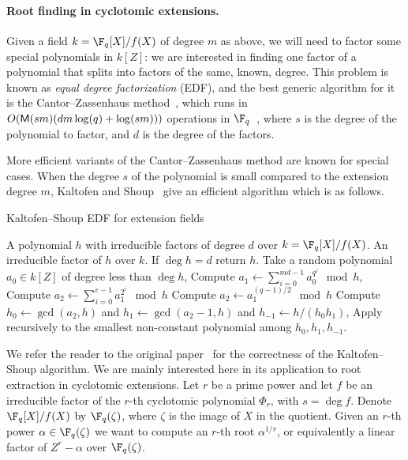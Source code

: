 \paragraph{\bf Root finding in cyclotomic extensions.}
Given a field $k = \F_q[X]/f(X)$ of degree $m$ as above, we will need
to factor some special polynomials in $k[Z]$: we are interested in
finding one factor of a polynomial that splits into factors of the
same, known, degree. This problem is known as \emph{equal degree
  factorization} (EDF), and the best generic algorithm for it is the
Cantor--Zassenhaus method~\cite{cantor1981,vzgathen+shoup92:journal}, which
runs in $O(\mathsf{M}(sm)(dm\log(q) + \log(sm)))$ operations in
$\F_q$~\cite[Th.~14.9]{vzGG}, where $s$ is the degree of the
polynomial to factor, and $d$ is the degree of the factors.

More efficient variants of the Cantor--Zassenhaus method are known for
special cases. When the degree $s$ of the polynomial is small compared
to the extension degree $m$, Kaltofen and Shoup~\cite{kaltofen+shoup97} 
give an efficient algorithm which is as follows.

\begin{algorithm}
  \caption{Kaltofen--Shoup EDF for extension fields}
	\label{alg:ks}
	\begin{algorithmic}[1]
		\REQUIRE A polynomial $h$  with irreducible factors of degree $d$ over $k=\F_q[X]/f(X)$.
		\ENSURE An irreducible factor of $h$ over $k$.
		\STATE If $\deg h = d$ return $h$.
		\STATE Take a random polynomial $a_0\in k[Z]$ of degree less than $\deg h$,
		\STATE\label{alg:ks-pseudotrace} Compute $\displaystyle a_1 
		\leftarrow \sum_{i=0}^{md-1} a_0^{q^i} \mod h$,
		\STATE\label{alg:ks:even} Compute $\displaystyle a_2 \leftarrow 
		\sum_{i=0}^{e-1} a_1^{2^i}\mod h$
		\ELSE
		\STATE\label{alg:ks:odd} Compute $a_2 \leftarrow a_1^{(q-1)/2}\mod h$
		\ENDIF
		\STATE\label{alg:ks:gcd} Compute $h_0\leftarrow\gcd(a_2,h)$ and 
		$h_1\leftarrow\gcd(a_2-1,h)$ and $h_{-1}\leftarrow h/(h_0h_1)$,
		\STATE Apply recursively to the smallest non-constant polynomial among 
		$h_0,h_1,h_{-1}$.
	\end{algorithmic}
\end{algorithm}


We refer the reader to the original paper~\cite{kaltofen+shoup97} for
the correctness of the Kaltofen--Shoup algorithm. We are mainly
interested here in its application to root extraction in cyclotomic
extensions. Let $r$ be a prime power and let $f$ be an irreducible
factor of the $r$-th cyclotomic polynomial $\Phi_r$, with $s = \deg
f$. Denote $\F_q[X] / f(X)$ by $\F_q(\zeta)$, where $\zeta$ is the
image of $X$ in the quotient. Given an $r$-th power $\alpha \in
\F_q(\zeta)$ we want to compute an $r$-th root $\alpha^{1 / r}$, or
equivalently a linear factor of $Z^r - \alpha$ over $\F_q(\zeta)$.

